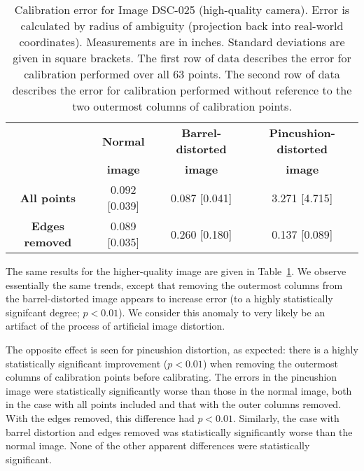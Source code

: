 \begin{table}[h!]
  \centering
  \begin{tabular}{c c c c}
    \toprule
    \textbf{ } & \textbf{Normal} & \textbf{Barrel-distorted} & \textbf{Pincushion-distorted}\\
    \textbf{ } & \textbf{image} & \textbf{image} & \textbf{image}\\
    \midrule
    \textbf{All points} & 0.092 [0.039] & 0.087 [0.041] & 3.271 [4.715] \\
    \textbf{Edges removed} & 0.089 [0.035] & 0.260 [0.180] & 0.137 [0.089] \\
    \bottomrule
  \end{tabular}
  \caption[Calibration error for Image DSC-025 (high-quality camera)]{Calibration error for Image DSC-025 (high-quality camera). Error is calculated by radius of ambiguity (projection back into real-world coordinates). Measurements are in inches. Standard deviations are given in square brackets. The first row of data describes the error for calibration performed over all 63 points. The second row of data describes the error for calibration performed without reference to the two outermost columns of calibration points.}
  \label{tbl:statsDSC}
\end{table}

The same results for the higher-quality image are given in Table~\ref{tbl:statsDSC}. We observe essentially the same trends, except that removing the outermost columns from the barrel-distorted image appears to increase error (to a highly statistically signifcant degree; $p < 0.01$). We consider this anomaly to very likely be an artifact of the process of artificial image distortion.

The opposite effect is seen for pincushion distortion, as expected: there is a highly statistically significant improvement ($p < 0.01$) when removing the outermost columns of calibration points before calibrating. The errors in the pincushion image were statistically significantly worse than those in the normal image, both in the case with all points included and that with the outer columns removed. With the edges removed, this difference had $p < 0.01$. Similarly, the case with barrel distortion and edges removed was statistically significantly worse than the normal image. None of the other apparent differences were statistically significant.

